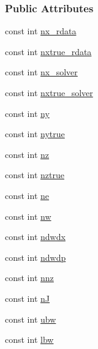 \begin{DoxyCompactItemize}
\end{DoxyCompactItemize}
\subsubsection*{Public Attributes}
\begin{DoxyCompactItemize}
\item 
const int \mbox{\hyperlink{classamici_1_1_model_ad7d8fea77a11ec1f5582088d1148ce8c}{nx\+\_\+rdata}}
\item 
const int \mbox{\hyperlink{classamici_1_1_model_a6315a521b453351fc77c7f37192f97e7}{nxtrue\+\_\+rdata}}
\item 
const int \mbox{\hyperlink{classamici_1_1_model_a3a6f34c755e990967cc756b92f406373}{nx\+\_\+solver}}
\item 
const int \mbox{\hyperlink{classamici_1_1_model_a4e4446d682ef66ca9902dfbd252bc69c}{nxtrue\+\_\+solver}}
\item 
const int \mbox{\hyperlink{classamici_1_1_model_a811734e12750524808dba01c57e92c66}{ny}}
\item 
const int \mbox{\hyperlink{classamici_1_1_model_a54bcfe56ad0df183516d096adf4e0b26}{nytrue}}
\item 
const int \mbox{\hyperlink{classamici_1_1_model_aa406c307f97060d218bc1fe594dfd08f}{nz}}
\item 
const int \mbox{\hyperlink{classamici_1_1_model_a9a451378ba5572ef7a3fd4dd89e1c227}{nztrue}}
\item 
const int \mbox{\hyperlink{classamici_1_1_model_a07d5274358ec39bfec473cd212a3cb78}{ne}}
\item 
const int \mbox{\hyperlink{classamici_1_1_model_a196986a3a7c4a7dff1c90ae254db7795}{nw}}
\item 
const int \mbox{\hyperlink{classamici_1_1_model_a761315b22459d5ca307556f210aece6b}{ndwdx}}
\item 
const int \mbox{\hyperlink{classamici_1_1_model_a1bd453ba21c508c3687f641d49430829}{ndwdp}}
\item 
const int \mbox{\hyperlink{classamici_1_1_model_aab84622e454402438efd61cc36645abe}{nnz}}
\item 
const int \mbox{\hyperlink{classamici_1_1_model_a0d2f49d2b15b08628451261e52f56e4f}{nJ}}
\item 
const int \mbox{\hyperlink{classamici_1_1_model_a8aac2b651892bb766a3cb79868944d81}{ubw}}
\item 
const int \mbox{\hyperlink{classamici_1_1_model_aa19cd03fcaffb7a0cebd666081c5a868}{lbw}}
\item 

\end{DoxyCompactItemize}

